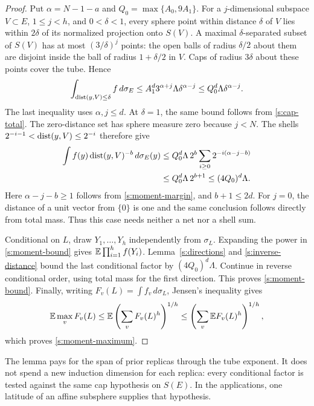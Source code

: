 \begin{proof}
Put \(\alpha=N-1-a\) and \(Q_0=\max\{A_0,9A_1\}\).
For a \(j\)-dimensional subspace \(V\subset E\), \(1\le j<h\),
and \(0<\delta<1\), every sphere point within distance \(\delta\)
of \(V\) lies within \(2\delta\) of its normalized projection onto
\(S(V)\). A maximal \(\delta\)-separated subset of \(S(V)\) has at
most \((3/\delta)^j\) points: the open balls of radius \(\delta/2\)
about them are disjoint inside the ball of radius \(1+\delta/2\)
in \(V\). Caps of radius \(3\delta\) about these points cover the
tube. Hence
\begin{equation}\label{s:tube}
 \int_{\operatorname{dist}(y,V)\le\delta}f\,d\sigma_E
 \le A_1^d3^{\alpha+j}\Lambda\delta^{\alpha-j}
 \le Q_0^d\Lambda\delta^{\alpha-j}.
\end{equation}
The last inequality uses \(\alpha,j\le d\). At \(\delta=1\), the
same bound follows from \eqref{s:cap-total}. The zero-distance set
has sphere measure zero because \(j<N\). The shells
\(2^{-i-1}<\operatorname{dist}(y,V)\le2^{-i}\) therefore give
\begin{align}
 \int f(y)\operatorname{dist}(y,V)^{-b}\,d\sigma_E(y)
 &\le Q_0^d\Lambda\,2^b
       \sum_{i\ge0}2^{-i(\alpha-j-b)}\notag\\
 &\le Q_0^d\Lambda\,2^{b+1}
 \le (4Q_0)^d\Lambda.\label{s:inverse-distance}
\end{align}
Here \(\alpha-j-b\ge1\) follows from
\eqref{s:moment-margin}, and \(b+1\le2d\). For \(j=0\), the distance
of a unit vector from \(\{0\}\) is one and the same conclusion follows
directly from total mass. Thus this case needs neither a net nor a
shell sum.

Conditional on \(L\), draw \(Y_1,\ldots,Y_h\) independently from
\(\sigma_L\). Expanding the power in \eqref{s:moment-bound} gives
\(\mathbb E\prod_{i=1}^h f(Y_i)\).
Lemma~\ref{s:directions} and \eqref{s:inverse-distance} bound the last
conditional factor by \((4Q_0)^d\Lambda\). Continue in reverse
conditional order, using total mass for the first direction. This
proves \eqref{s:moment-bound}. Finally, writing
\(F_v(L)=\int f_v\,d\sigma_L\), Jensen's inequality gives
\[
 \mathbb E\max_vF_v(L)
 \le\mathbb E\left(\sum_vF_v(L)^h\right)^{1/h}
 \le\left(\sum_v\mathbb E F_v(L)^h\right)^{1/h},
\]
which proves \eqref{s:moment-maximum}.
\end{proof}

The lemma pays for the span of prior replicas through the tube
exponent. It does not spend a new induction dimension for each
replica: every conditional factor is tested against the same cap
hypothesis on \(S(E)\). In the applications, one latitude of an
affine subsphere supplies that hypothesis.

